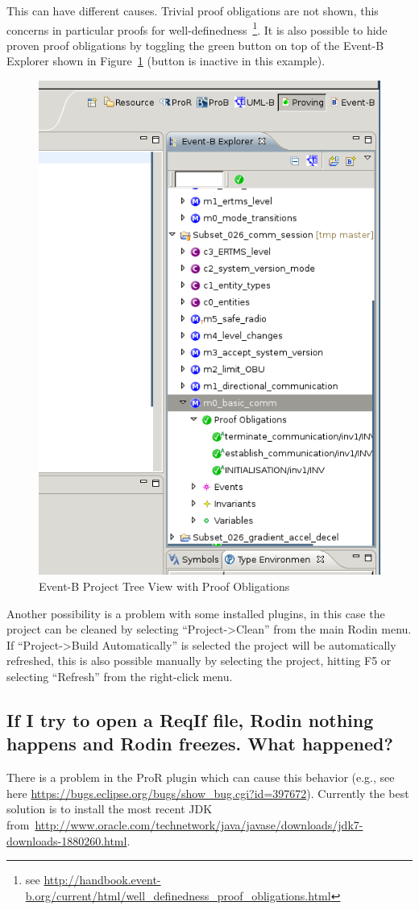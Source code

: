 \documentclass[10pt,a4paper]{article}
\begin{document}
This can have different causes. Trivial proof obligations are not shown, this
concerns in particular proofs for well-definedness~\footnote{see
  \url{http://handbook.event-b.org/current/html/well_definedness_proof_obligations.html}}. It
is also possible to hide proven proof obligations by toggling the green button
on top of the Event-B Explorer shown in
Figure~\ref{fig:tree-proof-obligations} (button is inactive in this example).

\begin{figure}[H]
  \centering
  \includegraphics[width=.5\textwidth]{RodinEventBView}
  \caption{Event-B Project Tree View with Proof Obligations}
  \label{fig:tree-proof-obligations}
\end{figure}

Another possibility is a problem with some installed plugins, in this case the
project can be cleaned by selecting ``Project->Clean'' from the main Rodin
menu. If  ``Project->Build Automatically'' is selected the project will be
automatically refreshed, this is also possible manually by selecting the
project, hitting F5 or selecting ``Refresh'' from the right-click menu.

\subsection{If I try to open a ReqIf file, Rodin nothing happens and Rodin
  freezes. What happened?}
\label{sec:if-i-try}

There is a problem in the ProR plugin which can cause this behavior (e.g., see
here \url{https://bugs.eclipse.org/bugs/show_bug.cgi?id=397672}). Currently
the best solution is to install the most recent JDK
from~\url{http://www.oracle.com/technetwork/java/javase/downloads/jdk7-downloads-1880260.html}.
\end{document}
